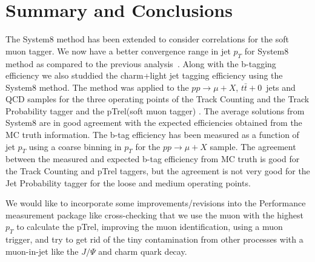 \section{Summary and Conclusions}


 The System8 method has been extended to consider correlations for the soft
muon tagger. We now have a better convergence range in jet $p_T$ for System8
method as compared to the previous analysis~\cite{ref:btag_oldnote}. Along with
the b-tagging efficiency we also studdied the charm+light jet tagging 
efficiency using the System8 method. The method was applied to the 
$pp\rightarrow \mu +X$, $t\bar{t}+0$~jets and QCD samples for the three 
operating points of the Track Counting and the Track Probability tagger and the
pTrel(soft muon tagger) . The average solutions from System8 are in good 
agreement with the expected efficiencies obtained from the MC truth information.
The b-tag efficiency has been measured as a function of jet $p_T$ using a coarse
binning in $p_T$ for the $pp\rightarrow \mu +X$ sample. The agreement between 
the measured and expected b-tag efficiency from MC truth is good for the Track 
Counting and pTrel taggers, but the agreement is not very good for the 
Jet Probability tagger for the loose and medium operating points.

 We would like to incorporate some improvements/revisions into the Performance 
measurement package like cross-checking that we use the muon with the highest 
$p_T$ to calculate the pTrel, improving the muon identification, 
using a muon trigger, and try to get rid of the tiny contamination from other 
processes with a muon-in-jet like the $J/\Psi $ and charm quark decay.
